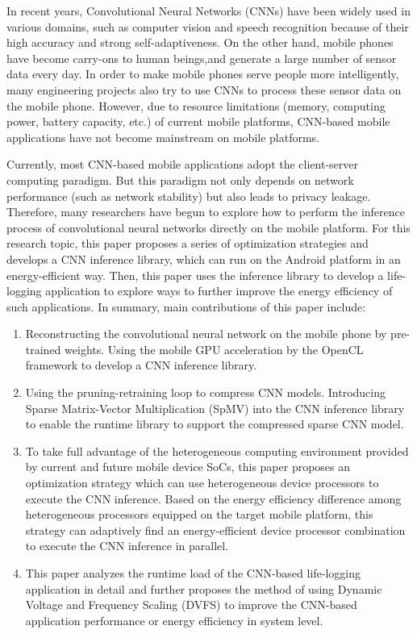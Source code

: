 \begin{enabstract}
In recent years, Convolutional Neural Networks (CNNs) have been widely used in various domains, such as computer vision and speech recognition because of their high accuracy and strong self-adaptiveness. On the other hand, mobile phones have become carry-ons to human beings,and generate a large number of sensor data every day. In order to make mobile phones serve people more intelligently, many engineering projects also try to use CNNs to process these sensor data on the mobile phone. However, due to resource limitations (memory, computing power, battery capacity, etc.) of current mobile platforms, CNN-based mobile applications have not become mainstream on mobile platforms.

Currently, most CNN-based mobile applications adopt the client-server computing paradigm. But this paradigm not only depends on network performance (such as network stability) but also leads to privacy leakage. Therefore, many researchers have begun to explore how to perform the inference process of convolutional neural networks directly on the mobile platform. For this research topic, this paper proposes a series of optimization strategies and develops a CNN inference library, which can run on the Android platform in an energy-efficient way. Then, this paper uses the inference library to develop a life-logging application to explore ways to further improve the energy efficiency of such applications. In summary, main contributions of this paper include:

\begin{enumerate}
  \item Reconstructing the convolutional neural network on the mobile phone by pre-trained weights. Using the mobile GPU acceleration by the OpenCL framework to develop a CNN inference library.
  \item Using the pruning-retraining loop to compress CNN models. Introducing Sparse Matrix-Vector Multiplication (SpMV) into the CNN inference library to enable the runtime library to support the compressed sparse CNN model.
  \item To take full advantage of the heterogeneous computing environment provided by current and future mobile device SoCs, this paper proposes an optimization strategy which can use heterogeneous device processors to execute the CNN inference. Based on the energy efficiency difference among heterogeneous processors equipped on the target mobile platform, this strategy can adaptively find an energy-efficient device processor combination to execute the CNN inference in parallel.
  \item This paper analyzes the runtime load of the CNN-based life-logging application in detail and further proposes the method of using Dynamic Voltage and Frequency Scaling (DVFS) to improve the CNN-based application performance or energy efficiency in system level.
\end{enumerate}


\end{enabstract}

